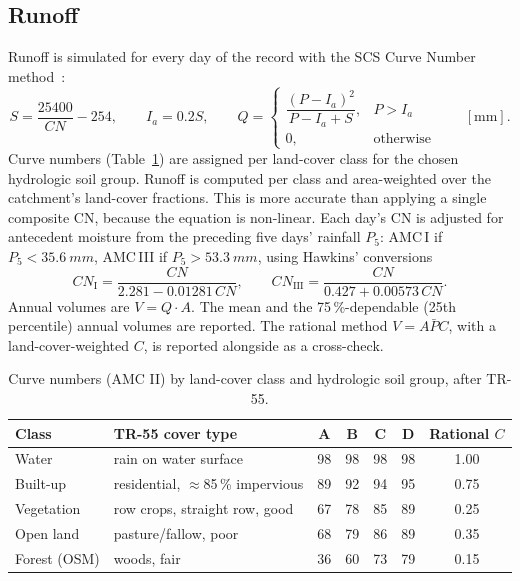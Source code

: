 \documentclass[11pt,a4paper]{article}
\begin{document}
\subsection{Runoff}\label{sec:runoff}
Runoff is simulated for every day of the record with the SCS Curve Number
method~\cite{tr55}:
\begin{equation}
S=\frac{25400}{CN}-254,\qquad I_a=0.2S,\qquad
Q=\begin{cases}\dfrac{(P-I_a)^2}{P-I_a+S}, & P>I_a\\[4pt] 0, & \text{otherwise}\end{cases}
\qquad[\text{mm}].
\end{equation}
Curve numbers (Table~\ref{tab:cn}) are assigned per land-cover class for the chosen hydrologic
soil group. Runoff is computed per class and area-weighted over the catchment's land-cover
fractions. This is more accurate than applying a single composite CN, because the equation is
non-linear. Each day's CN is adjusted for antecedent moisture from the preceding five days'
rainfall $P_5$: AMC\,I if $P_5<\SI{35.6}{mm}$, AMC\,III if $P_5>\SI{53.3}{mm}$, using Hawkins'
conversions~\cite{hawkins1985}
\begin{equation}
CN_{\mathrm{I}}=\frac{CN}{2.281-0.01281\,CN},\qquad CN_{\mathrm{III}}=\frac{CN}{0.427+0.00573\,CN}.
\end{equation}
Annual volumes are $V=Q\cdot A$. The mean and the 75\,\%-dependable (25th percentile) annual
volumes are reported. The rational method $V=A\bar P C$, with a land-cover-weighted $C$, is
reported alongside as a cross-check.

\begin{table}[H]
\centering\small
\caption{Curve numbers (AMC II) by land-cover class and hydrologic soil group, after TR-55.}
\label{tab:cn}
\begin{tabular}{@{}llcccc c@{}}
\toprule
Class & TR-55 cover type & A & B & C & D & Rational $C$\\
\midrule
Water & rain on water surface & 98 & 98 & 98 & 98 & 1.00\\
Built-up & residential, $\approx$85\,\% impervious & 89 & 92 & 94 & 95 & 0.75\\
Vegetation & row crops, straight row, good & 67 & 78 & 85 & 89 & 0.25\\
Open land & pasture/fallow, poor & 68 & 79 & 86 & 89 & 0.35\\
Forest (OSM) & woods, fair & 36 & 60 & 73 & 79 & 0.15\\
\bottomrule
\end{tabular}
\end{table}
\end{document}
